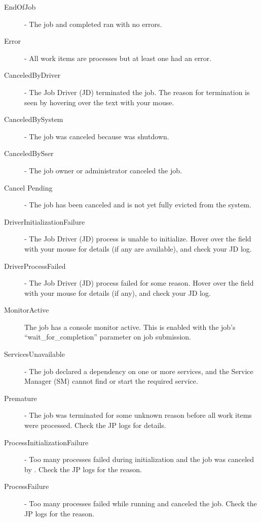 \begin{description}
              \begin{description}
                  \item[EndOfJob] - The job and completed ran with no errors. 
                  \item[Error] - All work items are processes but at least one had an error. 
                  \item[CanceledByDriver] - The Job Driver (JD) terminated the job. The reason for
                    termination is seen by hovering over the text with your mouse.
                  \item[CanceledBySystem] - The job was canceled because {\DUCC} was shutdown. 
                  \item[CanceledBySser] - The job owner or {\DUCC} administrator canceled the job. 
                  \item[Cancel Pending] - The job has been canceled and is not yet fully evicted
                    from the system.
                  \item[DriverInitializationFailure] - The Job Driver (JD) process is unable to initialize. Hover over 
                    the field with your mouse for details (if any are available), and check your JD log. 
                  \item[DriverProcessFailed] - The Job Driver (JD) process failed for some reason. Hover over the 
                    field with your mouse for details (if any), and check your JD log. 
                  \item[MonitorActive] The job has a console monitor active.  This is enabled with the
                    job's ``wait\_for\_completion'' parameter on job submission.
                  \item[ServicesUnavailable] - The job declared a dependency on one or more services, and the 
                    Service Manager (SM) cannot find or start the required service. 
                  \item[Premature] - The job was terminated for some unknown reason before all work items were 
                    processed. Check the JP logs for details. 
                  \item[ProcessInitializationFailure] - Too many processes failed during
                    initialization and the job was canceled by {\DUCC}.  Check the JP logs for the
                    reason.
                  \item[ProcessFailure] - Too many processes failed while running and {\DUCC} canceled
                    the job.  Check the JP logs for the reason.

\end{description}
\end{description}
